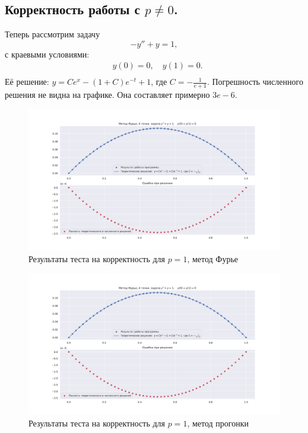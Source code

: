 \documentclass[14pt,a4paper]{extarticle}
\newcommand{\1}{\mathbbm{1}}
\begin{document}
\subsection{Корректность работы с $p\neq0$.}
Теперь рассмотрим задачу
\begin{equation*} 
    -y'' + y = 1,
\end{equation*}
с краевыми условиями:
\begin{align*}
    & y(0) = 0, \quad y(1) = 0. \\
\end{align*}
Её решение: $y = C e^x - (1 + C) e^{-t} + 1$, где $C = -\frac{1}{e + 1}$. Погрешность численного решения не видна на графике. Она составляет примерно $3e-6$.
\begin{figure}
    \centering
    \includegraphics[scale=0.4]{figs/f50p1f1.pdf}
    \caption{Результаты теста на корректность для $p=1$, метод Фурье}
\end{figure}

\begin{figure}
    \centering
    \includegraphics[scale=0.4]{figs/s50p1f1.pdf}
    \caption{Результаты теста на корректность для $p=1$, метод прогонки}
\end{figure}
\end{document}
